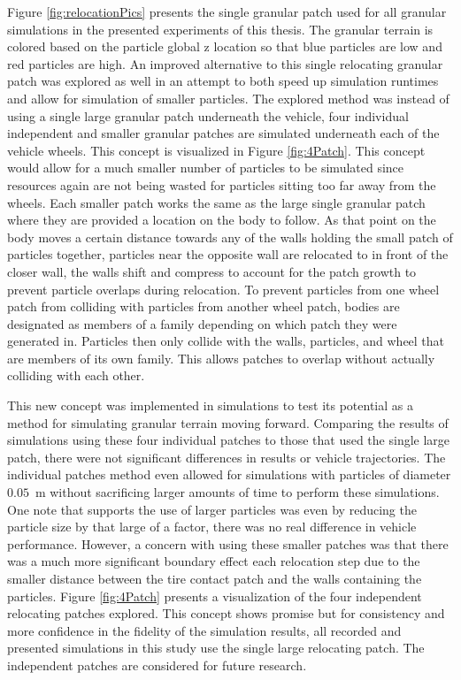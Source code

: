 \documentclass[12pt,onecolumn]{report}
\begin{document}
Figure \ref{fig:relocationPics} presents the single granular patch used for all granular simulations in the presented experiments of this thesis. The granular terrain is colored based on the particle global z location so that blue particles are low and red particles are high. An improved alternative to this single relocating granular patch was explored as well in an attempt to both speed up simulation runtimes and allow for simulation of smaller particles. The explored method was instead of using a single large granular patch underneath the vehicle, four individual independent and smaller granular patches are simulated underneath each of the vehicle wheels. This concept is visualized in Figure \ref{fig:4Patch}. This concept would allow for a much smaller number of particles to be simulated since resources again are not being wasted for particles sitting too far away from the wheels. Each smaller patch works the same as the large single granular patch where they are provided a location on the body to follow. As that point on the body moves a certain distance towards any of the walls holding the small patch of particles together, particles near the opposite wall are relocated to in front of the closer wall, the walls shift and compress to account for the patch growth to prevent particle overlaps during relocation. To prevent particles from one wheel patch from colliding with particles from another wheel patch, bodies are designated as members of a family depending on which patch they were generated in. Particles then only collide with the walls, particles, and wheel that are members of its own family. This allows patches to overlap without actually colliding with each other. 

This new concept was implemented in simulations to test its potential as a method for simulating granular terrain moving forward. Comparing the results of simulations using these four individual patches to those that used the single large patch, there were not significant differences in results or vehicle trajectories. The individual patches method even allowed for simulations with particles of diameter $0.05$~m without sacrificing larger amounts of time to perform these simulations. One note that supports the use of larger particles was even by reducing the particle size by that large of a factor, there was no real difference in vehicle performance. However, a concern with using these smaller patches was that there was a much more significant boundary effect each relocation step due to the smaller distance between the tire contact patch and the walls containing the particles. Figure \ref{fig:4Patch} presents a visualization of the four independent relocating patches explored. This concept shows promise but for consistency and more confidence in the fidelity of the simulation results, all recorded and presented simulations in this study use the single large relocating patch. The independent patches are considered for future research. 
\end{document}
